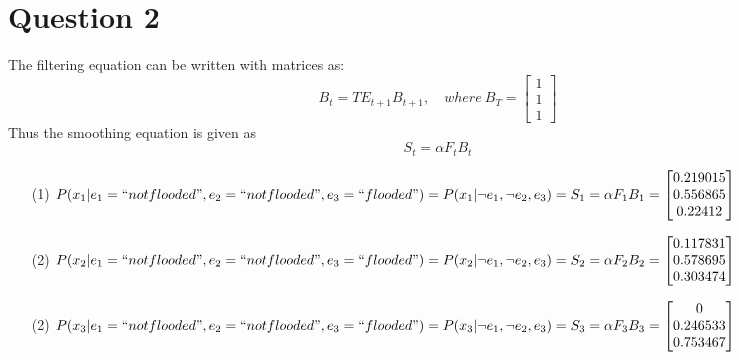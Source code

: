\documentclass[letter, 10pt]{article}
\begin{document}
\section*{Question 2} The filtering equation can be written with matrices as:
\begin{equation*}
    B_t = TE_{t+1}B_{t+1}, \quad where\ B_T = \begin{bmatrix}1\\1\\1\end{bmatrix}
\end{equation*}
Thus the smoothing equation is given as 
\begin{equation*}
    S_t = \alpha F_t B_t
\end{equation*}
\begin{itemize}
    \item[(1)] $P(x_1|e_1=``not flooded", e_2=``not flooded", e_3=``flooded") = P(x_1| \neg e_1, \neg e_2, e_3) = S_1 = \alpha F_1B_1 = 
    \begin{bmatrix}
        0.219015\\
        0.556865\\
        0.22412
    \end{bmatrix}$
    \item[(2)] $P(x_2|e_1=``not flooded", e_2=``not flooded", e_3=``flooded") = P(x_2| \neg e_1, \neg e_2, e_3) = S_2 = \alpha F_2B_2 = 
    \begin{bmatrix}
        0.117831\\
        0.578695\\
        0.303474
    \end{bmatrix}$
    \item[(2)] $P(x_3|e_1=``not flooded", e_2=``not flooded", e_3=``flooded") = P(x_3| \neg e_1, \neg e_2, e_3) = S_3 = \alpha F_3B_3 = 
    \begin{bmatrix}
        0\\
        0.246533\\
        0.753467
    \end{bmatrix}$
\end{itemize}
\end{document}
